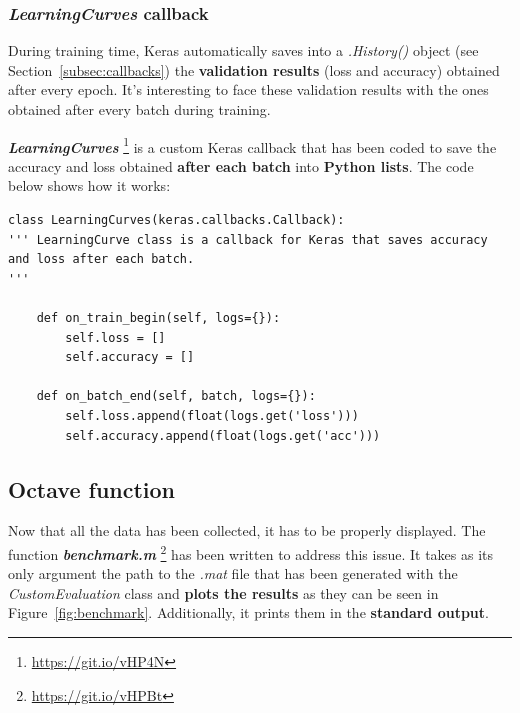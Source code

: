 \subsubsection{\textit{LearningCurves} callback} \label{subsubsec:learningcurves}
During training time, Keras automatically saves into a \textit{.History()} object (see Section~\ref{subsec:callbacks}) the \textbf{validation results} (loss and accuracy) obtained after every epoch. It's interesting to face these validation results with the ones obtained after every batch during training.

\textbf{\textit{LearningCurves}} \footnote{\url{https://git.io/vHP4N}} is a custom Keras callback that has been coded to save the accuracy and loss obtained \textbf{after each batch} into \textbf{Python lists}. The code below shows how it works:
\begin{lstlisting}
class LearningCurves(keras.callbacks.Callback):
''' LearningCurve class is a callback for Keras that saves accuracy
and loss after each batch.
'''    

	def on_train_begin(self, logs={}):
		self.loss = []
		self.accuracy = []
	
	def on_batch_end(self, batch, logs={}):
		self.loss.append(float(logs.get('loss')))
		self.accuracy.append(float(logs.get('acc')))
\end{lstlisting}

\subsection{Octave function}
Now that all the data has been collected, it has to be properly displayed. The function \textbf{\textit{benchmark.m}} \footnote{\url{https://git.io/vHPBt}} has been written to address this issue. It takes as its only argument the path to the \textit{.mat} file that has been generated with the \textit{CustomEvaluation} class and \textbf{plots the results} as they can be seen in Figure~\ref{fig:benchmark}. Additionally, it prints them in the \textbf{standard output}.

